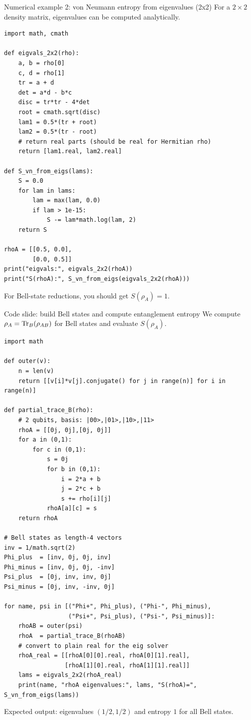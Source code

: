 \documentclass{beamer}
\begin{document}
\begin{frame}[fragile]{Numerical example 2: von Neumann entropy from eigenvalues (2x2)}
For a $2\times 2$ density matrix, eigenvalues can be computed analytically.
\begin{lstlisting}
import math, cmath

def eigvals_2x2(rho):
    a, b = rho[0]
    c, d = rho[1]
    tr = a + d
    det = a*d - b*c
    disc = tr*tr - 4*det
    root = cmath.sqrt(disc)
    lam1 = 0.5*(tr + root)
    lam2 = 0.5*(tr - root)
    # return real parts (should be real for Hermitian rho)
    return [lam1.real, lam2.real]

def S_vn_from_eigs(lams):
    S = 0.0
    for lam in lams:
        lam = max(lam, 0.0)
        if lam > 1e-15:
            S -= lam*math.log(lam, 2)
    return S

rhoA = [[0.5, 0.0],
        [0.0, 0.5]]
print("eigvals:", eigvals_2x2(rhoA))
print("S(rhoA):", S_vn_from_eigs(eigvals_2x2(rhoA)))
\end{lstlisting}

For Bell-state reductions, you should get $S(\rho_A)=1$.
\end{frame}

\begin{frame}[fragile]{Code slide: build Bell states and compute entanglement entropy}
We compute $\rho_A=\Tr_B(\rho_{AB})$ for Bell states and evaluate $S(\rho_A)$.
\begin{lstlisting}
import math

def outer(v):
    n = len(v)
    return [[v[i]*v[j].conjugate() for j in range(n)] for i in range(n)]

def partial_trace_B(rho):
    # 2 qubits, basis: |00>,|01>,|10>,|11>
    rhoA = [[0j, 0j],[0j, 0j]]
    for a in (0,1):
        for c in (0,1):
            s = 0j
            for b in (0,1):
                i = 2*a + b
                j = 2*c + b
                s += rho[i][j]
            rhoA[a][c] = s
    return rhoA

# Bell states as length-4 vectors
inv = 1/math.sqrt(2)
Phi_plus  = [inv, 0j, 0j, inv]
Phi_minus = [inv, 0j, 0j, -inv]
Psi_plus  = [0j, inv, inv, 0j]
Psi_minus = [0j, inv, -inv, 0j]

for name, psi in [("Phi+", Phi_plus), ("Phi-", Phi_minus),
                  ("Psi+", Psi_plus), ("Psi-", Psi_minus)]:
    rhoAB = outer(psi)
    rhoA  = partial_trace_B(rhoAB)
    # convert to plain real for the eig solver
    rhoA_real = [[rhoA[0][0].real, rhoA[0][1].real],
                 [rhoA[1][0].real, rhoA[1][1].real]]
    lams = eigvals_2x2(rhoA_real)
    print(name, "rhoA eigenvalues:", lams, "S(rhoA)=", S_vn_from_eigs(lams))
\end{lstlisting}
Expected output: eigenvalues $(1/2,1/2)$ and entropy $1$ for all Bell states.
\end{frame}
\end{document}
